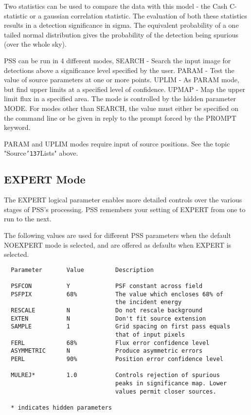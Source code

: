 \documentclass{book}
\renewcommand{\_}{{\tt\char'137}}     %
\begin{document}
Two statistics can be used to compare the data with this model - the
Cash C-statistic or a gaussian correlation statistic. The evaluation
of both these statistics results in a detection significance in sigma.
The equivalent probability of a one tailed normal distribution gives
the probability of the detection being spurious (over the whole sky).

PSS can be run in 4 different modes,
SEARCH - Search the input image for detections above a significance
level specified by the user.
PARAM - Test the value of source parameters at one or more points.
UPLIM - As PARAM mode, but find upper limits at a specified level
of confidence.
UPMAP - Map the upper limit flux in a specified area.
The mode is controlled by the hidden parameter MODE. For modes other
than SEARCH, the value must either be specified on the command line
or be given in reply to the prompt forced by the PROMPT keyword.

PARAM and UPLIM modes require input of source positions. See the
topic "Source\_Lists" above.

\subsection{EXPERT Mode}
The EXPERT logical parameter enables more detailed controls over
the various stages of PSS's processing. PSS remembers your setting
of EXPERT from one to run to the next.

The following values are used for different PSS parameters when
the default NOEXPERT mode is selected, and are offered as defaults
when EXPERT is selected.

\begin{verbatim}
  Parameter       Value         Description

  PSFCON          Y             PSF constant across field
  PSFPIX          68%           The value which encloses 68% of
                                the incident energy
  RESCALE         N             Do not rescale background
  EXTEN           N             Don't fit source extension
  SAMPLE          1             Grid spacing on first pass equals
                                that of input pixels
  FERL            68%           Flux error confidence level
  ASYMMETRIC      N             Produce asymmetric errors
  PERL            90%           Position error confidence level

  MULREJ*         1.0           Controls rejection of spurious
                                peaks in significance map. Lower
                                values permit closer sources.

  * indicates hidden parameters
\end{verbatim}
\end{document}
